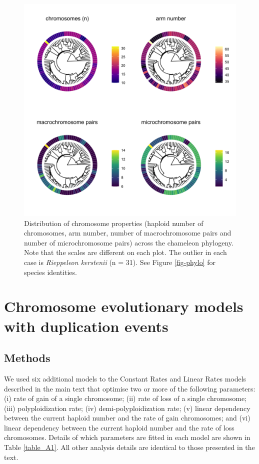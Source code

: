 \documentclass[a4paper, 12pt]{article}
\begin{document}
\newpage
\begin{figure}[H]
 \centering
  \includegraphics[width = \linewidth]{figures/trees-chromosome-properties.png}
  \caption{Distribution of chromosome properties (haploid number of chromosomes, arm number, number of macrochromosome pairs and number of microchromosome pairs) across the chameleon phylogeny. Note that the scales are different on each plot. The outlier in each case is \textit{Rieppeleon kerstenii} (n = 31). See Figure \ref{fig-phylo} for species identities.
}
  \label{fig-properties}
\end{figure} 

\newpage
\section{Chromosome evolutionary models with duplication events}

\subsection{Methods}

We used six additional models to the Constant Rates and Linear Rates models described in the main text that optimise two or more of the following parameters: (i) rate of gain of a single chromosome; (ii) rate of loss of a single chromosome; (iii) polyploidization rate; (iv) demi-polyploidization rate; (v) linear dependency between the current haploid number and the rate of gain chromosomes; and (vi) linear dependency between the current haploid number and the rate of loss chromosomes. Details of which parameters are fitted in each model are shown in Table \ref{table_A1}. All other analysis details are identical to those presented in the text.
\end{document}
